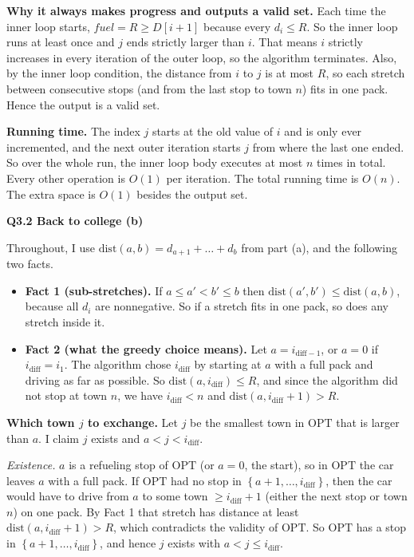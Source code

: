 \documentclass[11pt]{article}
\newcommand{\set}[1]{\left\{#1\right\}}
\newcommand{\OPT}{\mathrm{OPT}}
\newcommand{\qpage}[1]{\clearpage\noindent\textbf{\large #1}\par\medskip}
\begin{document}
\textbf{Why it always makes progress and outputs a valid set.}
Each time the inner loop starts, $\mathit{fuel} = R \ge D[i+1]$ because every $d_i \le R$.
So the inner loop runs at least once and $j$ ends strictly larger than $i$.
That means $i$ strictly increases in every iteration of the outer loop, so the algorithm terminates.
Also, by the inner loop condition, the distance from $i$ to $j$ is at most $R$, so each stretch between consecutive stops (and from the last stop to town $n$) fits in one pack.
Hence the output is a valid set.

\textbf{Running time.}
The index $j$ starts at the old value of $i$ and is only ever incremented, and the next outer iteration starts $j$ from where the last one ended.
So over the whole run, the inner loop body executes at most $n$ times in total.
Every other operation is $O(1)$ per iteration.
The total running time is $O(n)$.
The extra space is $O(1)$ besides the output set.
    

\qpage{Q3.2 Back to college (b)}

Throughout, I use $\mathrm{dist}(a,b) = d_{a+1} + \dots + d_b$ from part (a), and the following two facts.

\begin{itemize}
  \item \textbf{Fact 1 (sub-stretches).} If $a \le a' < b' \le b$ then $\mathrm{dist}(a',b') \le \mathrm{dist}(a,b)$, because all $d_i$ are nonnegative.
  So if a stretch fits in one pack, so does any stretch inside it.
  \item \textbf{Fact 2 (what the greedy choice means).} Let $a = i_{\text{diff}-1}$, or $a = 0$ if $i_{\text{diff}} = i_1$.
  The algorithm chose $i_{\text{diff}}$ by starting at $a$ with a full pack and driving as far as possible.
  So $\mathrm{dist}(a, i_{\text{diff}}) \le R$, and since the algorithm did not stop at town $n$, we have $i_{\text{diff}} < n$ and $\mathrm{dist}(a, i_{\text{diff}}+1) > R$.
\end{itemize}

\textbf{Which town $j$ to exchange.}
Let $j$ be the smallest town in $\OPT$ that is larger than $a$.
I claim $j$ exists and $a < j < i_{\text{diff}}$.

\emph{Existence.} $a$ is a refueling stop of $\OPT$ (or $a=0$, the start), so in $\OPT$ the car leaves $a$ with a full pack.
If $\OPT$ had no stop in $\set{a+1,\dots,i_{\text{diff}}}$, then the car would have to drive from $a$ to some town $\ge i_{\text{diff}}+1$ (either the next stop or town $n$) on one pack.
By Fact 1 that stretch has distance at least $\mathrm{dist}(a,i_{\text{diff}}+1) > R$, which contradicts the validity of $\OPT$.
So $\OPT$ has a stop in $\set{a+1,\dots,i_{\text{diff}}}$, and hence $j$ exists with $a < j \le i_{\text{diff}}$.
\end{document}
